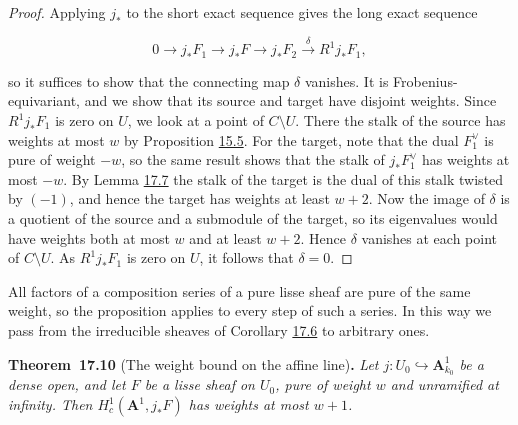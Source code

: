 \documentclass[11pt]{article}
\newenvironment{bpstatement}[2]{\par\addvspace{0.6\baselineskip}\noindent\textbf{#1}#2\textbf{.}\enspace\ignorespaces}
  {\par\addvspace{0.4\baselineskip}}
\newenvironment{bpstatementit}[2]{\begin{bpstatement}{#1}{#2}\itshape\ignorespaces}{\end{bpstatement}}
\begin{document}
\begin{proof}[{Proof}]\label{bp250}%
Applying \(j_*\) to the short exact sequence gives the long exact sequence

\[
0\to j_*F_1\to j_*F\to j_*F_2\xrightarrow{\ \delta\ }R^1j_*F_1,
\]

so it suffices to show that the connecting map \(\delta\) vanishes. It is Frobenius-equivariant, and we show that its source and target have disjoint weights. Since \(R^1j_*F_1\) is zero on \(U\), we look at a point of \(C\setminus U\). There the stalk of the source has weights at most \(w\) by Proposition \hyperref[bp134]{15.5}. For the target, note that the dual \(F_1^\vee\) is pure of weight \(-w\), so the same result shows that the stalk of \(j_*F_1^\vee\) has weights at most \(-w\). By Lemma \hyperref[bp245]{17.7} the stalk of the target is the dual of this stalk twisted by \((-1)\), and hence the target has weights at least \(w+2\). Now the image of \(\delta\) is a quotient of the source and a submodule of the target, so its eigenvalues would have weights both at most \(w\) and at least \(w+2\). Hence \(\delta\) vanishes at each point of \(C\setminus U\). As \(R^1j_*F_1\) is zero on \(U\), it follows that \(\delta=0\).
\end{proof}

\label{bp251}%
All factors of a composition series of a pure lisse sheaf are pure of the same weight, so the proposition applies to every step of such a series. In this way we pass from the irreducible sheaves of Corollary \hyperref[bp241]{17.6} to arbitrary ones.

\label{bp252}%
\begin{bpstatementit}{Theorem~17.10}{ (The weight bound on the affine line)}
Let \(j:U_0\hookrightarrow\mathbf A^1_{k_0}\) be a dense open, and let \(F\) be a lisse sheaf on \(U_0\), pure of weight \(w\) and unramified at infinity. Then \(H_c^1(\mathbf A^1,j_*F)\) has weights at most \(w+1\).
\end{bpstatementit}
\end{document}
